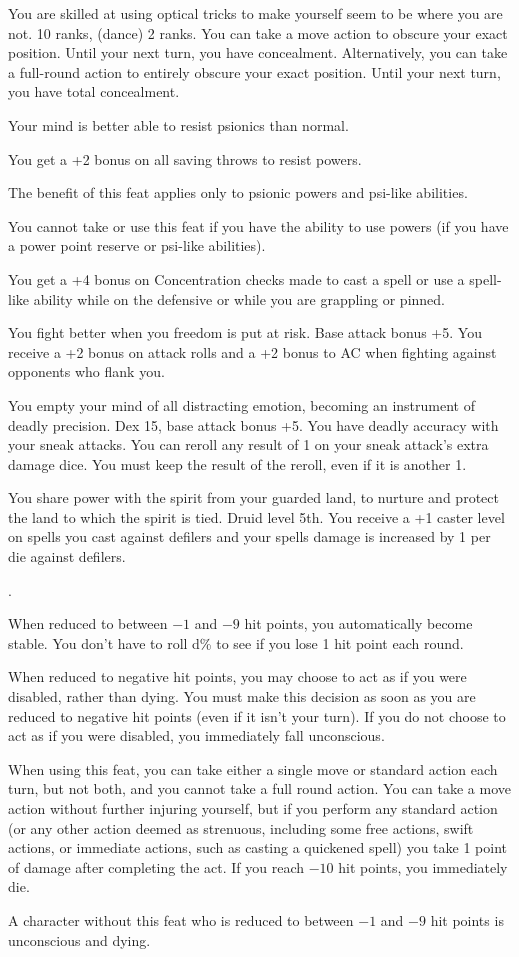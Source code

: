 {You are skilled at using optical tricks to make yourself seem to be where you are not.}
{ 10 ranks,  (dance) 2 ranks.}
{You can take a move action to obscure your exact position. Until your next turn, you have concealment. Alternatively, you can take a full-round action to entirely obscure your exact position. Until your next turn, you have total concealment.}{}{}

{Your mind is better able to resist psionics than normal.}{}
{You get a +2 bonus on all saving throws to resist powers.

The benefit of this feat applies only to psionic powers and psi-like abilities. %
}{}
{You cannot take or use this feat if you have the ability to use powers (if you have a power point reserve or psi-like abilities).}

{You get a +4 bonus on Concentration checks made to cast a spell or use a spell-like ability while on the defensive or while you are grappling or pinned.}

{You fight better when you freedom is put at risk.}
{Base attack bonus +5.}
{You receive a +2 bonus on attack rolls and a +2 bonus to AC when fighting against opponents who flank you.}
{}{}

{You empty your mind of all distracting emotion, becoming an instrument of deadly precision.}
{Dex 15, base attack bonus +5.}
{You have deadly accuracy with your sneak attacks. You can reroll any result of 1 on your sneak attack's extra damage dice. You must keep the result of the reroll, even if it is another 1.}{}{}

{You share power with the spirit from your guarded land, to nurture and protect the land to which the spirit is tied.}
{Druid level 5th.}
{You receive a +1 caster level on spells you cast against defilers and your spells damage is increased by 1 per die against defilers.}
{}{}

{}
{.}
{When reduced to between $-1$ and $-9$ hit points, you automatically become stable. You don't have to roll d\% to see if you lose 1 hit point each round.

When reduced to negative hit points, you may choose to act as if you were disabled, rather than dying. You must make this decision as soon as you are reduced to negative hit points (even if it isn't your turn). If you do not choose to act as if you were disabled, you immediately fall unconscious.

When using this feat, you can take either a single move or standard action each turn, but not both, and you cannot take a full round action. You can take a move action without further injuring yourself, but if you perform any standard action (or any other action deemed as strenuous, including some free actions, swift actions, or immediate actions, such as casting a quickened spell) you take 1 point of damage after completing the act. If you reach $-10$ hit points, you immediately die.}
{A character without this feat who is reduced to between $-1$ and $-9$ hit points is unconscious and dying.}
{}

